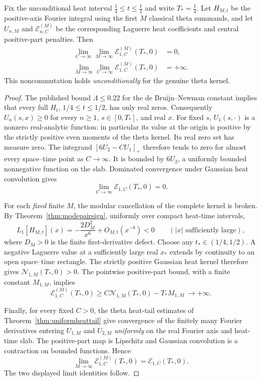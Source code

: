 \begin{theorem}\label{thm:noncommutingtheta}
Fix the unconditional heat interval
$\tfrac14\le t\le\tfrac12$ and write
$T_*=\tfrac14$. Let $H_{M,t}$ be the
positive-axis Fourier integral using the
first $M$ classical theta summands,
and let $U_{n,M}$ and
$\mathcal E^{(M)}_{n,C}$ be the corresponding
Laguerre heat coefficients and central
positive-part penalties. Then
\begin{align}
\lim_{C\to\infty}\lim_{M\to\infty}
\mathcal E^{(M)}_{1,C}(T_*,0)&=0,
\label{eq:limitsfirst}\\
\lim_{M\to\infty}\lim_{C\to\infty}
\mathcal E^{(M)}_{1,C}(T_*,0)&=+\infty.
\label{eq:limitssecond}
\end{align}
This noncommutation holds \emph{unconditionally}
for the genuine theta kernel.
\end{theorem}
\begin{proof}
The published bound $\Lambda\le0.22$
for the de Bruijn--Newman constant
\cite{Polymath15} implies that
every full $H_t$, $1/4\le t\le1/2$,
has only real zeros. Consequently
$U_n(s,x)\ge0$ for every $n\ge1$,
$s\in[0,T_*]$, and real $x$.
For fixed $s$, $U_1(s,\cdot)$ is
a nonzero real-analytic function:
in particular its value at the
origin is positive by the
strictly positive even moments
of the theta kernel. Its real
zero set has measure zero.
The integrand
$[6U_2-CU_1]_+$ therefore
tends to zero for almost every
space--time point as $C\to\infty$.
It is bounded by $6U_2$, a
uniformly bounded nonnegative
function on the slab.
Dominated convergence under
Gaussian heat convolution gives
\[
\lim_{C\to\infty}\mathcal E_{1,C}(T_*,0)=0.
\]

For each \emph{fixed} finite $M$,
the modular cancellation of the
complete kernel is broken.
By Theorem~\ref{thm:modepairsign},
uniformly over compact heat-time
intervals,
\[
L_1[H_{M,t}](x)=
-\frac{2D_M^2}{x^6}
+O_{M,t}(x^{-8})<0
\qquad(|x|\text{ sufficiently large}),
\]
where $D_M>0$ is the finite
first-derivative defect.
Choose any $t_*\in(1/4,1/2)$.
A negative Laguerre value at
a sufficiently large real $x_*$
extends by continuity to an open
space--time rectangle.
The strictly positive Gaussian
heat kernel therefore gives
$\mathcal N_{1,M}(T_*,0)>0$.
The pointwise positive-part
bound, with a finite constant
$M_{1,M}$, implies
\[
\mathcal E^{(M)}_{1,C}(T_*,0)
\ge C\mathcal N_{1,M}(T_*,0)
-T_*M_{1,M}\ \longrightarrow+\infty.
\]

Finally, for every fixed $C>0$,
the theta heat-tail estimates of
Theorem~\ref{thm:uniformheattail}
give convergence of the finitely
many Fourier derivatives entering
$U_{1,M}$ and $U_{2,M}$
\emph{uniformly} on the real
Fourier axis and heat-time slab.
The positive-part map is
Lipschitz and Gaussian convolution
is a contraction on bounded
functions. Hence
\[
\lim_{M\to\infty}
\mathcal E^{(M)}_{1,C}(T_*,0)
=\mathcal E_{1,C}(T_*,0).
\]
The two displayed limit identities
follow.
\end{proof}

